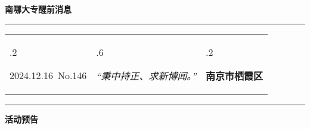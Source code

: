 \documentclass[letterpaper, 12pt]{article}
\begin{document}
\begin{center}
    \Huge\textbf{南哪大专醒前消息}
\end{center}
\vspace{4mm}
\hrule
\renewcommand\tabularxcolumn[1]{m{#1}}
\begin{tabularx}{\textwidth}{>{\hsize.2\hsize}X>{\hsize.6\hsize}X>{\hsize.2\hsize}X}
    \begin{flushleft}
        2024.12.16\, No.146
    \end{flushleft}
    &
    \begin{center}
        \textit{“秉中持正、求新博闻。”}
    \end{center}
    &
    \begin{flushright}
        \textbf{南京市栖霞区}
    \end{flushright}
\end{tabularx}
\vspace{-3.5mm}
\hrule
\vspace{4mm}
\centerline{\huge\textbf{活动预告}}
\end{document}
